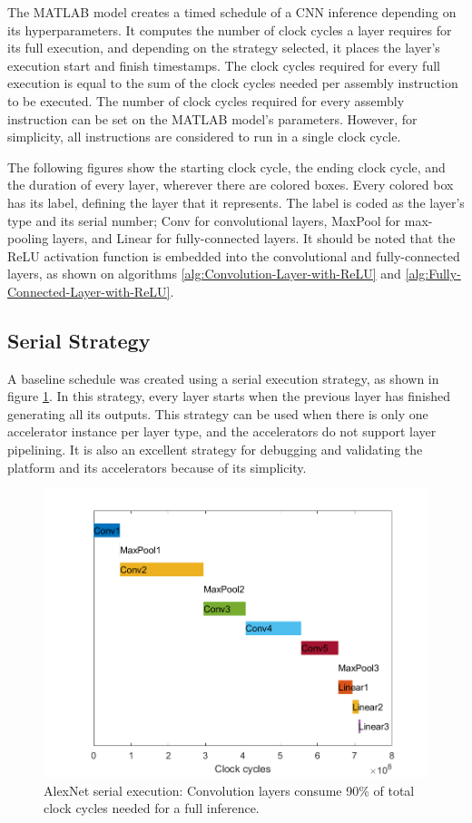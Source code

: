 The MATLAB model creates a timed schedule of a CNN inference depending on its hyperparameters. It computes the number of clock cycles a layer requires for its full execution, and depending on the strategy selected, it places the layer's execution start and finish timestamps. The clock cycles required for every full execution is equal to the sum of the clock cycles needed per assembly instruction to be executed. The number of clock cycles required for every assembly instruction can be set on the MATLAB model's parameters. However, for simplicity, all instructions are considered to run in a single clock cycle.

The following figures show the starting clock cycle, the ending clock cycle, and the duration of every layer, wherever there are colored boxes. Every colored box has its label, defining the layer that it represents. The label is coded as the layer's type and its serial number; Conv for convolutional layers, MaxPool for max-pooling layers, and Linear for fully-connected layers. It should be noted that the ReLU activation function is embedded into the convolutional and fully-connected layers, as shown on algorithms \ref{alg:Convolution-Layer-with-ReLU} and \ref{alg:Fully-Connected-Layer-with-ReLU}.

\subsection{Serial Strategy}
A baseline schedule was created using a serial execution strategy, as shown in figure \ref{fig:serial-execution}. In this strategy, every layer starts when the previous layer has finished generating all its outputs. This strategy can be used when there is only one accelerator instance per layer type, and the accelerators do not support layer pipelining. It is also an excellent strategy for debugging and validating the platform and its accelerators because of its simplicity.

\begin{figure} [H]
	\centering
	\includegraphics[width=\textwidth]{Images/Scheduling/Serial.png}
	\decoRule
	\caption[AlexNet serial execution]{AlexNet serial execution: Convolution layers consume 90\% of total clock cycles needed for a full inference.}
	\label{fig:serial-execution}
\end{figure}

